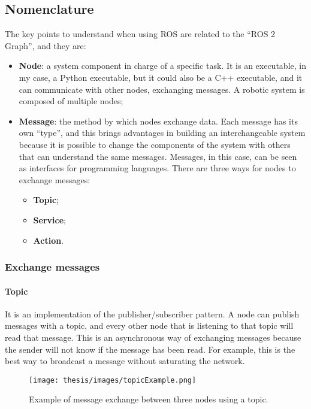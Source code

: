 \documentclass[../thesis.tex]{subfiles}
\begin{document}
\subsection{Nomenclature}
The key points to understand when using \acrshort{ROS} are related to the ``ROS 2 Graph'', and they are:
\begin{itemize}
    \item \textbf{Node}: a system component in charge of a specific task. It is an executable, in my case, a Python executable, but it could also be a C++ executable, and it can communicate with other nodes, exchanging messages. A robotic system is composed of multiple nodes; 
    \item \textbf{Message}: the method by which nodes exchange data. Each message has its own ``type'', and this brings advantages in building an interchangeable system because it is possible to change the components of the system with others that can understand the same messages. Messages, in this case, can be seen as interfaces for programming languages. There are three ways for nodes to exchange messages: 
        \begin{itemize}
            \item \textbf{Topic};
            \item \textbf{Service};
            \item \textbf{Action}.
        \end{itemize}
\end{itemize}

\subsubsection{Exchange messages}\label{sss:exchange_messages}
\paragraph{Topic}\label{p:exchange_message_with_topics}
It is an implementation of the publisher/subscriber pattern. A node can publish messages with a topic, and every other node that is listening to that topic will read that message. This is an asynchronous way of exchanging messages because the sender will not know if the message has been read. For example, this is the best way to broadcast a message without saturating the network. 
\begin{figure}[H]
    \centering
    \texttt{[image: thesis/images/topicExample.png]}
    \caption{Example of message exchange between three nodes using a topic.}
    \label{fig:exampleTopicExchangeMessage}
\end{figure}
\end{document}
